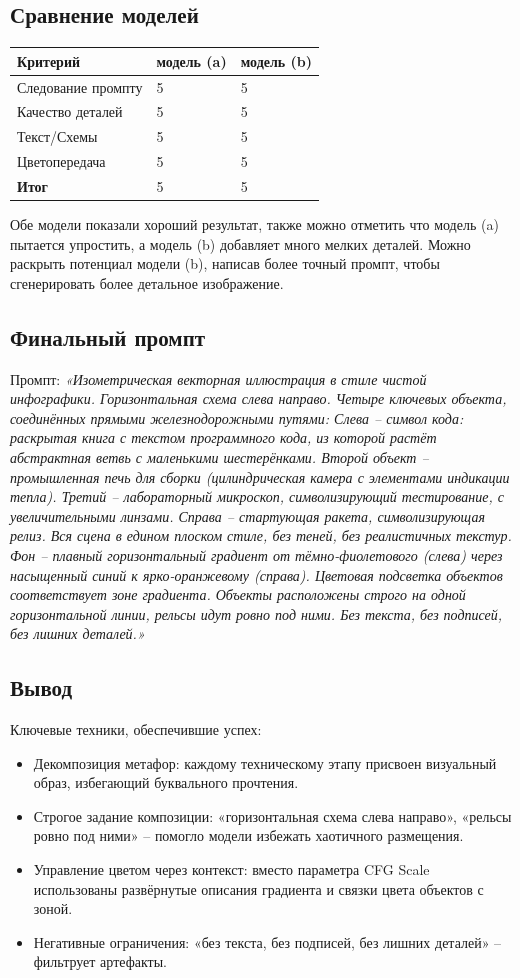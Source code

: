 \subsection{Сравнение моделей}
\begin{table}[h!]
	\centering
	\begin{tabular}{|l|p{5cm}|p{5cm}|}
		\hline
		\textbf{Критерий} & \textbf{модель (a)} & \textbf{модель (b)} \\
		\hline
		Следование промпту & 5 & 5 \\
		\hline
		Качество деталей & 5 & 5 \\
		\hline
		Текст/Схемы & 5 & 5 \\
		\hline
		Цветопередача  & 5 & 5 \\
		\hline
		\textbf{Итог} & 5 & 5\\
		\hline
	\end{tabular}
\end{table}
Обе модели показали хороший результат, также можно отметить что модель (a) пытается упростить, а модель (b) добавляет много мелких деталей. Можно раскрыть потенциал модели (b), написав более точный промпт, чтобы сгенерировать более детальное изображение.
\newpage
\subsection{Финальный промпт}
Промпт: \textit{«Изометрическая векторная иллюстрация в стиле чистой инфографики. Горизонтальная схема слева направо. Четыре ключевых объекта, соединённых прямыми железнодорожными путями:
Слева – символ кода: раскрытая книга с текстом программного кода, из которой растёт абстрактная ветвь с маленькими шестерёнками.
Второй объект – промышленная печь для сборки (цилиндрическая камера с элементами индикации тепла).
Третий – лабораторный микроскоп, символизирующий тестирование, с увеличительными линзами.
Справа – стартующая ракета, символизирующая релиз.
Вся сцена в едином плоском стиле, без теней, без реалистичных текстур. Фон – плавный горизонтальный градиент от тёмно-фиолетового (слева) через насыщенный синий к ярко-оранжевому (справа). Цветовая подсветка объектов соответствует зоне градиента. Объекты расположены строго на одной горизонтальной линии, рельсы идут ровно под ними. Без текста, без подписей, без лишних деталей.»}
\subsection{Вывод}
Ключевые техники, обеспечившие успех:
\begin{itemize}
	\item Декомпозиция метафор: каждому техническому этапу присвоен визуальный образ, избегающий буквального прочтения.
	\item Строгое задание композиции: «горизонтальная схема слева направо», «рельсы ровно под ними» – помогло модели избежать хаотичного размещения.
	\item Управление цветом через контекст: вместо параметра CFG Scale использованы развёрнутые описания градиента и связки цвета объектов с зоной.
	\item Негативные ограничения: «без текста, без подписей, без лишних деталей» – фильтрует артефакты.
\end{itemize}
